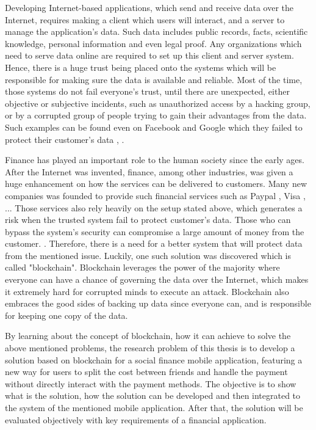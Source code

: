 \documentclass[twoside,numperchapter]{tutthesis} %
\begin{document}
Developing Internet-based applications, which send and receive data over the Internet, requires making a client which users will interact, and a server to manage the application's data. Such data includes public records, facts, scientific knowledge, personal information and even legal proof. Any organizations which need to serve data online are required to set up this client and server system. Hence, there is a huge trust being placed onto the systems which will be responsible for making sure the data is available and reliable. Most of the time, those systems do not fail everyone's trust, until there are unexpected, either objective or subjective incidents, such as unauthorized access by a hacking group, or by a corrupted group of people trying to gain their advantages from the data. Such examples can be found even on Facebook and Google which they failed to protect their customer's data \citep{FacebookLeakData}, \citep{GoogleLeakData}.

Finance has played an important role to the human society since the early ages. After the Internet was invented, finance, among other industries, was given a huge enhancement on how the services can be delivered to customers. Many new companies was founded to provide such financial services such as Paypal \citep{Paypal}, Visa \citep{Visa}, ... Those services also rely heavily on the setup stated above, which generates a risk when the trusted system fail to protect customer's data. Those who can bypass the system's security can compromise a large amount of money from the customer. \citep{IndianBankHack}. Therefore, there is a need for a better system that will protect data from the mentioned issue. Luckily, one such solution was discovered which is called "blockchain". Blockchain leverages the power of the majority where everyone can have a chance of governing the data over the Internet, which makes it extremely hard for corrupted minds to execute an attack. Blockchain also embraces the good sides of backing up data since everyone can, and is responsible for keeping one copy of the data.

By learning about the concept of blockchain, how it can achieve to solve the above mentioned problems, the research problem of this thesis is to develop a solution based on blockchain for a social finance mobile application, featuring a new way for users to split the cost between friends and handle the payment without directly interact with the payment methods. The objective is to show what is the solution, how the solution can be developed and then integrated to the system of the mentioned mobile application. After that, the solution will be evaluated objectively with key requirements of a financial application.
\end{document}
